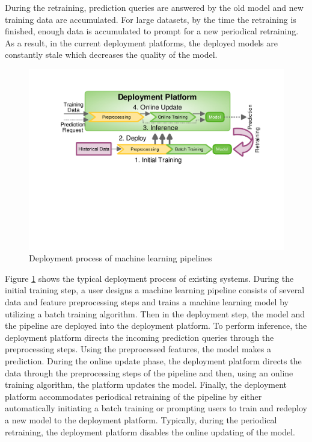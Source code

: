 During the retraining, prediction queries are answered by the old model and new training data are accumulated.
For large datasets, by the time the retraining is finished, enough data is accumulated to prompt for a new periodical retraining.
As a result, in the current deployment platforms, the deployed models are constantly stale which decreases the quality of the model.

\begin{figure}[h!]
\centering
\includegraphics[width=\columnwidth]{../images/generic-motivational-example-v2.pdf}
\caption{Deployment process of machine learning pipelines}
\label{fig:motivational-example}
\end{figure}

Figure \ref{fig:motivational-example} shows the typical deployment process of existing systems.
During the initial training step, a user designs a machine learning pipeline consists of several data and feature preprocessing steps and trains a machine learning model by utilizing a batch training algorithm.
Then in the deployment step, the model and the pipeline are deployed into the deployment platform.
To perform inference, the deployment platform directs the incoming prediction queries through the preprocessing steps.
Using the preprocessed features, the model makes a prediction.
During the online update phase, the deployment platform directs the data through the preprocessing steps of the pipeline and then, using an online training algorithm, the platform updates the model.
Finally, the deployment platform accommodates periodical retraining of the pipeline by either automatically initiating a batch training or prompting users to train and redeploy a new model to the deployment platform.
Typically, during the periodical retraining, the deployment platform disables the online updating of the model.

